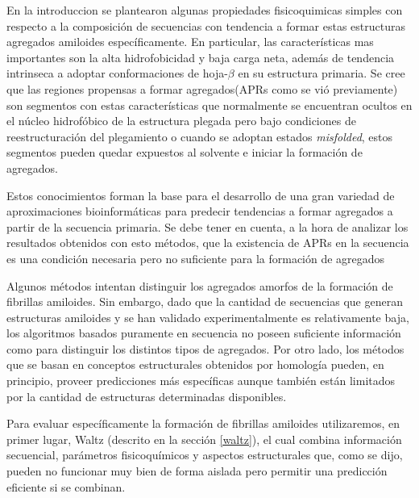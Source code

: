En la introduccion se plantearon algunas propiedades fisicoquimicas simples con respecto a la composición de secuencias con tendencia a formar estas estructuras agregados amiloides específicamente.
En particular, las características mas importantes son la alta hidrofobicidad y baja carga neta, además de tendencia intrinseca a adoptar conformaciones de hoja-$\beta$ en su estructura primaria.
Se cree que las regiones propensas a formar agregados(APRs como se vió previamente) son segmentos con estas características que normalmente se encuentran ocultos en el núcleo hidrofóbico de la estructura plegada pero
bajo condiciones de reestructuración del plegamiento o cuando se adoptan estados \textit{misfolded}, estos segmentos pueden quedar expuestos al solvente e iniciar la formación de agregados.

Estos conocimientos forman la base para el desarrollo de una gran variedad de aproximaciones bioinformáticas para predecir tendencias a formar agregados a partir de la secuencia primaria.
Se debe tener en cuenta, a la hora de analizar los resultados obtenidos con esto métodos, que la existencia de APRs en la secuencia es una condición necesaria pero no suficiente para la formación de agregados


Algunos métodos intentan distinguir los agregados amorfos de la formación de fibrillas amiloides. 
Sin embargo, dado que la cantidad de secuencias que generan estructuras amiloides y se han validado experimentalmente es relativamente baja, los algoritmos basados puramente en secuencia no poseen 
suficiente información como para distinguir los distintos tipos de agregados.
Por otro lado, los métodos que se basan en conceptos estructurales obtenidos por homología pueden, en principio, proveer predicciones más específicas aunque también están limitados por la cantidad de estructuras determinadas disponibles.

Para evaluar específicamente la formación de fibrillas amiloides utilizaremos, en primer lugar, Waltz (descrito en la sección \ref{waltz}),
el cual combina información secuencial, parámetros fisicoquímicos y aspectos estructurales que, como se dijo, pueden no funcionar muy bien de forma aislada pero permitir una predicción eficiente si se combinan.



